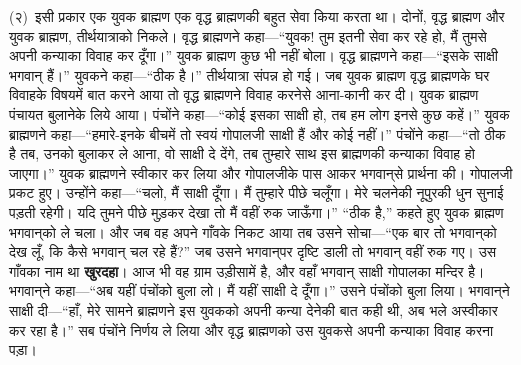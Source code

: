 \begin{sloppypar}\justifying{}
(२)~इसी प्रकार एक युवक ब्राह्मण एक वृद्ध ब्राह्मणकी बहुत सेवा किया करता था। दोनों, वृद्ध ब्राह्मण और युवक ब्राह्मण, तीर्थयात्राको निकले। वृद्ध ब्राह्मणने कहा—“युवक! तुम इतनी सेवा कर रहे हो, मैं तुमसे अपनी कन्याका विवाह कर दूँगा।” युवक ब्राह्मण कुछ भी नहीं बोला। वृद्ध ब्राह्मणने कहा—“इसके साक्षी भगवान् हैं।” युवकने कहा—“ठीक है।” तीर्थयात्रा संपन्न हो गई। जब युवक ब्राह्मण वृद्ध ब्राह्मणके घर विवाहके विषयमें बात करने आया तो वृद्ध ब्राह्मणने विवाह करनेसे आना-कानी कर दी। युवक ब्राह्मण पंचायत बुलानेके लिये आया। पंचोंने कहा—“कोई इसका साक्षी हो, तब हम लोग इनसे कुछ कहें।” युवक ब्राह्मणने कहा—“हमारे-इनके बीचमें तो स्वयं गोपालजी साक्षी हैं और कोई नहीं।” पंचोंने कहा—“तो ठीक है तब, उनको बुलाकर ले आना, वो साक्षी दे देंगे, तब तुम्हारे साथ इस ब्राह्मणकी कन्याका विवाह हो जाएगा।” युवक ब्राह्मणने स्वीकार कर लिया और गोपालजीके पास आकर भगवान्‌से प्रार्थना की। गोपालजी प्रकट हुए। उन्होंने कहा—“चलो, मैं साक्षी दूँगा। मैं तुम्हारे पीछे चलूँगा। मेरे चलनेकी नूपुरकी धुन सुनाई पड़ती रहेगी। यदि तुमने पीछे मुड़कर देखा तो मैं वहीं रुक जाऊँगा।” “ठीक है,” कहते हुए युवक ब्राह्मण भगवान्‌को ले चला। और जब वह अपने गाँवके निकट आया तब उसने सोचा—“एक बार तो भगवान्‌को देख लूँ, कि कैसे भगवान् चल रहे हैं?” जब उसने भगवान्‌पर दृष्टि डाली तो भगवान् वहीं रुक गए। उस गाँवका नाम था \textbf{खुरदहा}। आज भी वह ग्राम उड़ीसामें है, और वहाँ भगवान् साक्षी गोपालका मन्दिर है। भगवान्‌ने कहा—“अब यहीं पंचोंको बुला लो। मैं यहीं साक्षी दे दूँगा।” उसने पंचोंको बुला लिया। भगवान्‌ने साक्षी दी—“हाँ, मेरे सामने ब्राह्मणने इस युवकको अपनी कन्या देनेकी बात कही थी, अब भले अस्वीकार कर रहा है।” सब पंचोंने निर्णय ले लिया और वृद्ध ब्राह्मणको उस युवकसे अपनी कन्याका विवाह करना पड़ा।
\end{sloppypar}
